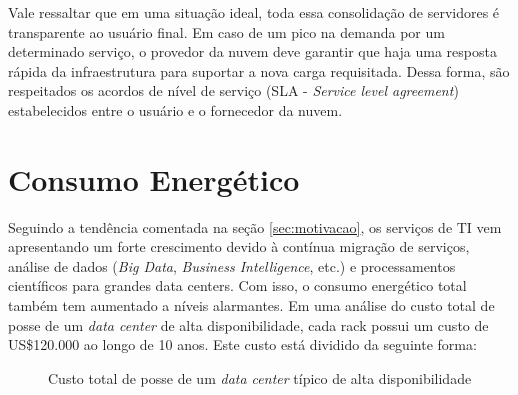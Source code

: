 Vale ressaltar que em uma situação ideal, toda essa consolidação de servidores
é transparente ao usuário final. Em caso de um pico na demanda por um determinado
serviço, o provedor da nuvem deve garantir que haja uma resposta rápida da 
infraestrutura para suportar a nova carga requisitada. Dessa forma, são 
respeitados os acordos de nível de serviço (SLA - \emph{Service level agreement})
estabelecidos entre o usuário e o fornecedor da nuvem.

\section{Consumo Energético}
\label{sec:consumo_energetico}

Seguindo a tendência comentada na seção \ref{sec:motivacao}, os serviços de TI
vem apresentando um forte crescimento devido à contínua migração de serviços,
análise de dados (\emph{Big Data}, \emph{Business Intelligence}, etc.) e
processamentos científicos para grandes data centers. Com isso, o consumo
energético total também tem aumentado a níveis alarmantes. Em uma análise do custo
total de posse de um \emph{data center} de alta disponibilidade, cada rack
possui um custo de US\$120.000 ao longo de 10 anos. \cite{rasmussen:tco_data_center} 
Este custo está dividido da seguinte forma:

\newcommand{\slice}[4]{
  \pgfmathparse{0.5*#1+0.5*#2}
  \let\midangle\pgfmathresult

  \draw[thick,fill=black!10] (0,0) -- (#1:1) arc (#1:#2:1) -- cycle;

  \node[label=\midangle:#4] at (\midangle:1) {};

  \pgfmathparse{min((#2-#1-10)/110*(-0.3),0)}
  \let\temp\pgfmathresult
  \pgfmathparse{max(\temp,-0.5) + 0.8}
  \let\innerpos\pgfmathresult
  \node at (\midangle:\innerpos) {#3};
}

\begin{figure}
\centering
{}
\caption{Custo total de posse de um \emph{data center} típico de alta
disponibilidade \cite{rasmussen:tco_data_center}} \label{fig:tco_data_center}
\end{figure}

